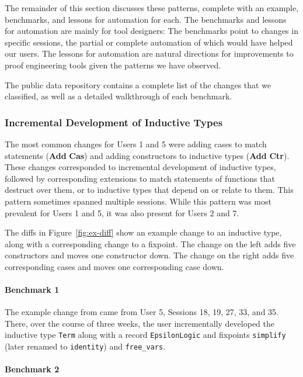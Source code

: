 The remainder of this section discusses these patterns, complete
with an example, benchmarks, and lessons for automation 
for each.
The benchmarks and lessons for automation are mainly for tool designers:
The benchmarks point to changes in specific sessions, the partial or 
complete automation of which would have helped our users.
The lessons for automation are natural directions for improvements
to proof engineering tools given the patterns we have observed.

The public data repository contains a complete list of the changes
that we classified, as well as a detailed walkthrough of each benchmark.

\subsubsection{Incremental Development of Inductive Types}
\label{sec:pat1}

The most common changes for Users 1 and 5 were adding cases to match statements
(\textbf{Add} \textbf{Cas}) and adding constructors to inductive types
(\textbf{Add} \textbf{Ctr}).
These changes corresponded to incremental development of inductive types,
followed by corresponding extensions to match statements of functions
that destruct over them, or to inductive types that depend
on or relate to them.
This pattern sometimes spanned multiple sessions.
While this pattern was most prevalent for Users 1 and 5, it was also
present for Users 2 and 7.

The diffs in Figure~\ref{fig:ex-diff} show an example change to
an inductive type, along with a corresponding change to a fixpoint.
The change on the left adds five constructors and moves one constructor down.
The change on the right adds five corresponding cases and moves one
corresponding case down.

\paragraph{Benchmark 1}

The example change from  came from
User 5, Sessions 18, 19, 27, 33, and 35.
There, over the course of three weeks, the user incrementally developed the inductive type \lstinline{Term}
along with a record \lstinline{EpsilonLogic} and fixpoints
\lstinline{simplify} (later renamed to \lstinline{identity}) and \lstinline{free_vars}.

\paragraph{Benchmark 2}

